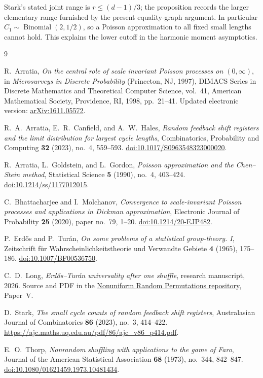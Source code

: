 \documentclass[11pt]{article}
\theoremstyle{remark}
\begin{document}
Stark's stated joint range is $r\le(d-1)/3$; the proposition records the
larger elementary range furnished by the present equality-graph argument.
In particular $C_1\sim\operatorname{Binomial}(2,1/2)$, so a Poisson
approximation to all fixed small lengths cannot hold. This explains the
lower cutoff in the harmonic moment asymptotics.

\begin{thebibliography}{9}

R.~Arratia,
\emph{On the central role of scale invariant Poisson processes on $(0,\infty)$},
in \emph{Microsurveys in Discrete Probability} (Princeton, NJ, 1997),
DIMACS Series in Discrete Mathematics and Theoretical Computer Science,
vol.~41, American Mathematical Society, Providence, RI, 1998, pp.~21--41.
Updated electronic version: \href{https://arxiv.org/abs/1611.05572}{arXiv:1611.05572}.

R.~A.~Arratia, E.~R.~Canfield, and A.~W.~Hales,
\emph{Random feedback shift registers and the limit distribution for largest cycle lengths},
Combinatorics, Probability and Computing \textbf{32} (2023), no.~4, 559--593.
\href{https://doi.org/10.1017/S0963548323000020}{doi:10.1017/S0963548323000020}.

R.~Arratia, L.~Goldstein, and L.~Gordon,
\emph{Poisson approximation and the Chen--Stein method},
Statistical Science \textbf{5} (1990), no.~4, 403--424.
\href{https://doi.org/10.1214/ss/1177012015}{doi:10.1214/ss/1177012015}.

C.~Bhattacharjee and I.~Molchanov,
\emph{Convergence to scale-invariant Poisson processes and applications in Dickman approximation},
Electronic Journal of Probability \textbf{25} (2020), paper no.~79, 1--20.
\href{https://doi.org/10.1214/20-EJP482}{doi:10.1214/20-EJP482}.

P.~Erd\H{o}s and P.~Tur\'{a}n,
\emph{On some problems of a statistical group-theory. I},
Zeitschrift f\"ur Wahrscheinlichkeitstheorie und Verwandte Gebiete
\textbf{4} (1965), 175--186.
\href{https://doi.org/10.1007/BF00536750}{doi:10.1007/BF00536750}.

C.~D.~Long,
\emph{Erd\H{o}s--Tur\'{a}n universality after one shuffle},
research manuscript, 2026. Source and PDF in the
\href{https://github.com/long-mathematics/nonuniform-random-permutations}{Nonuniform Random Permutations repository}, Paper~V.

D.~Stark,
\emph{The small cycle counts of random feedback shift registers},
Australasian Journal of Combinatorics \textbf{86} (2023), no.~3, 414--422.
\url{https://ajc.maths.uq.edu.au/pdf/86/ajc_v86_p414.pdf}.

E.~O.~Thorp,
\emph{Nonrandom shuffling with applications to the game of Faro},
Journal of the American Statistical Association \textbf{68} (1973),
no.~344, 842--847.
\href{https://doi.org/10.1080/01621459.1973.10481434}{doi:10.1080/01621459.1973.10481434}.

\end{thebibliography}
\end{document}
